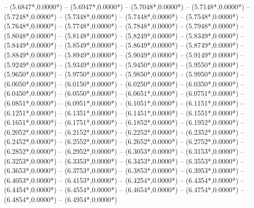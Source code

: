 {	-- ({5.6847*\dx},{0.0000*\dy})
	-- ({5.6947*\dx},{0.0000*\dy})
	-- ({5.7048*\dx},{0.0000*\dy})
	-- ({5.7148*\dx},{0.0000*\dy})
	-- ({5.7248*\dx},{0.0000*\dy})
	-- ({5.7348*\dx},{0.0000*\dy})
	-- ({5.7448*\dx},{0.0000*\dy})
	-- ({5.7548*\dx},{0.0000*\dy})
	-- ({5.7648*\dx},{0.0000*\dy})
	-- ({5.7748*\dx},{0.0000*\dy})
	-- ({5.7848*\dx},{0.0000*\dy})
	-- ({5.7948*\dx},{0.0000*\dy})
	-- ({5.8048*\dx},{0.0000*\dy})
	-- ({5.8148*\dx},{0.0000*\dy})
	-- ({5.8249*\dx},{0.0000*\dy})
	-- ({5.8349*\dx},{0.0000*\dy})
	-- ({5.8449*\dx},{0.0000*\dy})
	-- ({5.8549*\dx},{0.0000*\dy})
	-- ({5.8649*\dx},{0.0000*\dy})
	-- ({5.8749*\dx},{0.0000*\dy})
	-- ({5.8849*\dx},{0.0000*\dy})
	-- ({5.8949*\dx},{0.0000*\dy})
	-- ({5.9049*\dx},{0.0000*\dy})
	-- ({5.9149*\dx},{0.0000*\dy})
	-- ({5.9249*\dx},{0.0000*\dy})
	-- ({5.9349*\dx},{0.0000*\dy})
	-- ({5.9450*\dx},{0.0000*\dy})
	-- ({5.9550*\dx},{0.0000*\dy})
	-- ({5.9650*\dx},{0.0000*\dy})
	-- ({5.9750*\dx},{0.0000*\dy})
	-- ({5.9850*\dx},{0.0000*\dy})
	-- ({5.9950*\dx},{0.0000*\dy})
	-- ({6.0050*\dx},{0.0000*\dy})
	-- ({6.0150*\dx},{0.0000*\dy})
	-- ({6.0250*\dx},{0.0000*\dy})
	-- ({6.0350*\dx},{0.0000*\dy})
	-- ({6.0450*\dx},{0.0000*\dy})
	-- ({6.0550*\dx},{0.0000*\dy})
	-- ({6.0651*\dx},{0.0000*\dy})
	-- ({6.0751*\dx},{0.0000*\dy})
	-- ({6.0851*\dx},{0.0000*\dy})
	-- ({6.0951*\dx},{0.0000*\dy})
	-- ({6.1051*\dx},{0.0000*\dy})
	-- ({6.1151*\dx},{0.0000*\dy})
	-- ({6.1251*\dx},{0.0000*\dy})
	-- ({6.1351*\dx},{0.0000*\dy})
	-- ({6.1451*\dx},{0.0000*\dy})
	-- ({6.1551*\dx},{0.0000*\dy})
	-- ({6.1651*\dx},{0.0000*\dy})
	-- ({6.1751*\dx},{0.0000*\dy})
	-- ({6.1852*\dx},{0.0000*\dy})
	-- ({6.1952*\dx},{0.0000*\dy})
	-- ({6.2052*\dx},{0.0000*\dy})
	-- ({6.2152*\dx},{0.0000*\dy})
	-- ({6.2252*\dx},{0.0000*\dy})
	-- ({6.2352*\dx},{0.0000*\dy})
	-- ({6.2452*\dx},{0.0000*\dy})
	-- ({6.2552*\dx},{0.0000*\dy})
	-- ({6.2652*\dx},{0.0000*\dy})
	-- ({6.2752*\dx},{0.0000*\dy})
	-- ({6.2852*\dx},{0.0000*\dy})
	-- ({6.2952*\dx},{0.0000*\dy})
	-- ({6.3053*\dx},{0.0000*\dy})
	-- ({6.3153*\dx},{0.0000*\dy})
	-- ({6.3253*\dx},{0.0000*\dy})
	-- ({6.3353*\dx},{0.0000*\dy})
	-- ({6.3453*\dx},{0.0000*\dy})
	-- ({6.3553*\dx},{0.0000*\dy})
	-- ({6.3653*\dx},{0.0000*\dy})
	-- ({6.3753*\dx},{0.0000*\dy})
	-- ({6.3853*\dx},{0.0000*\dy})
	-- ({6.3953*\dx},{0.0000*\dy})
	-- ({6.4053*\dx},{0.0000*\dy})
	-- ({6.4153*\dx},{0.0000*\dy})
	-- ({6.4254*\dx},{0.0000*\dy})
	-- ({6.4354*\dx},{0.0000*\dy})
	-- ({6.4454*\dx},{0.0000*\dy})
	-- ({6.4554*\dx},{0.0000*\dy})
	-- ({6.4654*\dx},{0.0000*\dy})
	-- ({6.4754*\dx},{0.0000*\dy})
	-- ({6.4854*\dx},{0.0000*\dy})
	-- ({6.4954*\dx},{0.0000*\dy})
}
